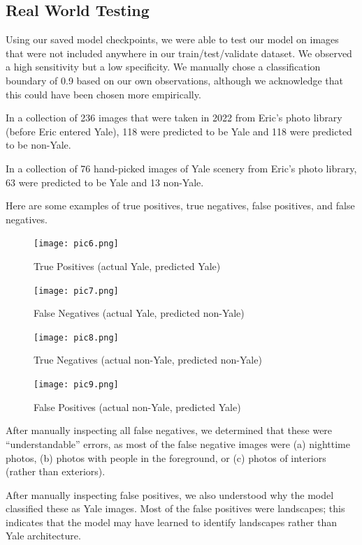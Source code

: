 \documentclass[letterpaper]{article} %
\begin{document}
\subsection{Real World Testing}

Using our saved model checkpoints, we were able to test our model on images that were not included anywhere in our train/test/validate dataset. We observed a high sensitivity but a low specificity. We manually chose a classification boundary of 0.9 based on our own observations, although we acknowledge that this could have been chosen more empirically.

In a collection of 236 images that were taken in 2022 from Eric’s photo library (before Eric entered Yale), 118 were predicted to be Yale and 118 were predicted to be non-Yale.

In a collection of 76 hand-picked images of Yale scenery from Eric’s photo library, 63 were predicted to be Yale and 13 non-Yale.

Here are some examples of true positives, true negatives, false positives, and false negatives.
\begin{figure}
    \centering
    \texttt{[image: pic6.png]}
    \caption{True Positives (actual Yale, predicted Yale)}
    \label{fig:enter-label}
\end{figure}

\begin{figure}
    \centering
    \texttt{[image: pic7.png]}
    \caption{False Negatives (actual Yale, predicted non-Yale)}
    \label{fig:enter-label}
\end{figure}

\begin{figure}
    \centering
    \texttt{[image: pic8.png]}
    \caption{True Negatives (actual non-Yale, predicted non-Yale)}
    \label{fig:enter-label}
\end{figure}

\begin{figure}
    \centering
    \texttt{[image: pic9.png]}
    \caption{False Positives (actual non-Yale, predicted Yale)}
    \label{fig:enter-label}
\end{figure}

After manually inspecting all false negatives, we determined that these were “understandable” errors, as most of the false negative images were (a) nighttime photos, (b) photos with people in the foreground, or (c) photos of interiors (rather than exteriors).

After manually inspecting false positives, we also understood why the model classified these as Yale images. Most of the false positives were landscapes; this indicates that the model may have learned to identify landscapes rather than Yale architecture.
\end{document}
